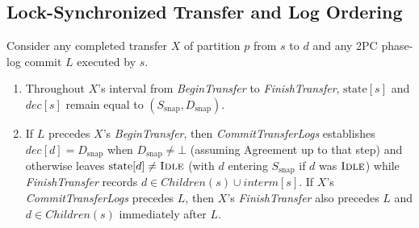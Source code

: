 \documentclass[sigconf,nonacm]{acmart}
\newcommand{\stIdle}{\textsc{Idle}}
\newcommand{\Children}{\mathit{Children}}
\newcommand{\interm}{\mathit{interm}}
\newcommand{\dec}{\mathit{dec}}
\begin{document}
\subsection{Lock-Synchronized Transfer and Log Ordering}
\label{sec:lock}
\begin{lemma}\label{lem:lock}
Consider any completed transfer \(X\) of partition \(p\) from \(s\) to
\(d\) and any 2PC phase-log commit \(L\) executed by \(s\).
\begin{enumerate}
  \item[\emph{(a)}] Throughout \(X\)'s interval from \emph{BeginTransfer} to
    \emph{FinishTransfer}, \(\mathrm{state}[s]\) and \(\dec[s]\) remain equal
    to \((S_{\mathrm{snap}}, D_{\mathrm{snap}})\).
  \item[\emph{(b)}] If \(L\) precedes \(X\)'s \emph{BeginTransfer}, then
    \emph{CommitTransferLogs} establishes \(\dec[d] = D_{\mathrm{snap}}\)
    when \(D_{\mathrm{snap}} \neq \bot\) (assuming Agreement up to that step)
    and otherwise leaves \(\mathrm{state}[d] \neq \stIdle\) (with \(d\)
    entering \(S_{\mathrm{snap}}\) if \(d\) was \(\stIdle\)) while
    \emph{FinishTransfer} records \(d \in \Children(s) \cup \interm[s]\). If
    \(X\)'s \emph{CommitTransferLogs} precedes \(L\), then \(X\)'s
    \emph{FinishTransfer} also precedes \(L\) and \(d \in \Children(s)\)
    immediately after \(L\).
\end{enumerate}
\end{lemma}
\end{document}
